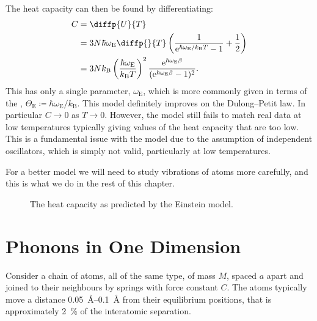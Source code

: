 \documentclass[fleqn]{NotesClass}
\newcommand*{\boltzmann}{k_{\mathrm{B}}}
\newcommand*{\e}{\mathrm{e}}
\newcommand*{\einstein}{\mathrm{E}}
\begin{document}
    The heat capacity can then be found by differentiating:
    \begin{align}
        C &= \diffp{U}{T}\\
        &= 3N\hbar\omega_{\einstein} \diffp{}{T}\left( \frac{1}{\e^{\hbar\omega_{\einstein}/\boltzmann T} - 1} + \frac{1}{2} \right)\\
        &= 3N\boltzmann \left( \frac{\hbar\omega_{\einstein}}{\boltzmann T} \right)^2 \frac{\e^{\hbar\omega_{\einstein}\beta}}{(\e^{\hbar\omega_{\einstein}\beta} - 1)^2}.
    \end{align}
    This has only a single parameter, \(\omega_{\einstein}\), which is more commonly given in terms of the , \(\Theta_{\einstein} \coloneqq \hbar\omega_{\einstein}/\boltzmann\).
    This model definitely improves on the Dulong--Petit law.
    In particular \(C \to 0\) as \(T \to 0\).
    However, the model still fails to match real data at low temperatures typically giving values of the heat capacity that are too low.
    This is a fundamental issue with the model due to the assumption of independent oscillators, which is simply not valid, particularly at low temperatures.
    
    For a better model we will need to study vibrations of atoms more carefully, and this is what we do in the rest of this chapter.
    
    \begin{figure}
        \caption[Heat capacity predicted by Einstein model.]{The heat capacity as predicted by the Einstein model.}
    \end{figure}
    
    \section{Phonons in One Dimension}
    Consider a chain of atoms, all of the same type, of mass \(M\), spaced \(a\) apart and joined to their neighbours by springs with force constant \(C\).
    The atoms typically move a distance \qtyrange{0.05}{0.1}{\angstrom} from their equilibrium positions, that is approximately \qty{2}{\percent} of the interatomic separation.
    
\end{document}
